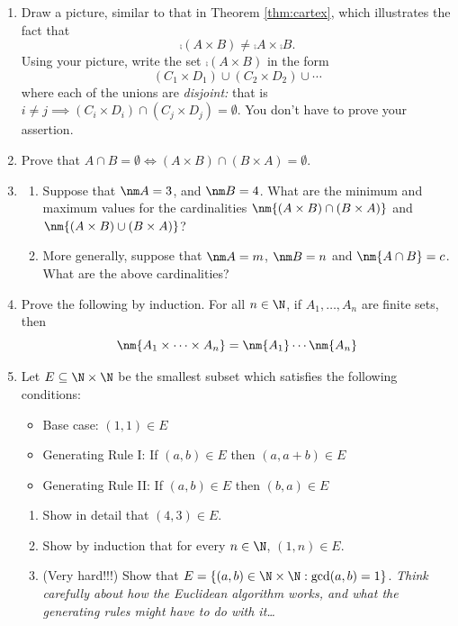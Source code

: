 \begin{enumerate}
	\item\label{ex:cartneg} Draw a picture, similar to that in Theorem \ref{thm:cartex}, which illustrates the fact that
	\[\comp{(A\times B)}\neq \comp A\times \comp B.\]
	Using your picture, write the set $\comp{(A\times B)}$ in the form
	\[(C_1\times D_1)\cup (C_2\times D_2)\cup\cdots\]
	where each of the unions are \emph{disjoint:} that is $i\neq j\implies (C_i\times D_i)\cap (C_j\times D_j)=\emptyset$. You don't have to prove your assertion.
		
	\item Prove that $A\cap B=\emptyset\iff (A\times B)\cap(B\times A)=\emptyset$.
	
  \item\begin{enumerate}
		\item Suppose that $\nm A=3$, and $\nm B=4$. What are the minimum and maximum values for the cardinalities $\nm{(A\times B)\cap(B\times A)}$ and $\nm{(A\times B)\cup(B\times A)}$?
		\item More generally, suppose that $\nm A=m$, $\nm B=n$ and $\nm{A\cap B}=c$. What are the above cardinalities?
	\end{enumerate}
	
  \item Prove the following by induction. For all $n\in\N$, if $A_1,\ldots,A_n$ are finite sets, then
  \[\nm{A_1\times\cdots\times A_n}=\nm{A_1}\cdots\nm{A_n}\] 
	
	\item Let $E\subseteq\N\times\N$ be the smallest subset which satisfies the following conditions:
	\begin{itemize}
		\item Base case: $(1,1)\in E$
		\item Generating Rule I: If $(a,b)\in E$ then $(a,a+b)\in E$
		\item Generating Rule II: If $(a,b)\in E$ then $(b,a)\in E$
	\end{itemize}

	\begin{enumerate}
		\item Show in detail that $(4,3)\in E$.
		\item Show by induction that for every $n\in\N$, $(1,n)\in E$.
		\item (Very hard!!!) Show that $E=\{(a,b)\in\N\times\N:\gcd(a,b)=1\}$. \emph{Think carefully about how the Euclidean algorithm works, and what the generating rules might have to do with it\ldots}
	\end{enumerate}
	

\end{enumerate}
